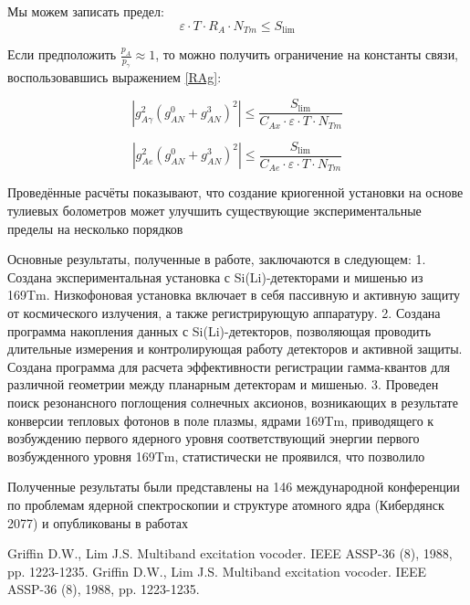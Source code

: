 \documentclass[a4paper,article,14pt]{extarticle}
\begin{document}
Мы можем записать предел:
\begin{equation}
   \varepsilon  \cdot T \cdot {R_A} \cdot N_{Tm} \leqslant {S_{\lim }}
\end{equation}

Если предположить $\frac{{{p_A}}}{{{p_\gamma}}} \approx 1$, то можно получить ограничение на константы связи, воспользовавшись выражением \eqref{RAg}:

\begin{equation}
     \left| g_{A\gamma}^2{\left( {g_{AN}^0 + g_{AN}^3} \right)^2} \right| \leqslant \frac{{S_{\lim }}}{{C_{Ax}} \cdot \varepsilon  \cdot T \cdot N_{Tm} } 
\end{equation}


\begin{equation}
     \left| g_{Ae}^2{\left( {g_{AN}^0 + g_{AN}^3} \right)^2} \right| \leqslant \frac{{S_{\lim }}}{{C_{Ae}} \cdot \varepsilon  \cdot T \cdot N_{Tm} } 
\end{equation}

\newpage

Проведённые расчёты показывают, что создание криогенной установки на основе тулиевых болометров может улучшить существующие экспериментальные пределы на несколько порядков
\pagebreak

Основные результаты, полученные в работе, заключаются в
следующем:
1. Создана экспериментальная установка с Si(Li)-детекторами и
мишенью из 169Tm. Низкофоновая установка включает в себя пассивную и
активную защиту от космического излучения, а также регистрирующую
аппаратуру.
2. Создана программа накопления данных с Si(Li)-детекторов,
позволяющая проводить длительные измерения и контролирующая работу
детекторов и активной защиты. Создана программа для расчета
эффективности регистрации гамма-квантов для различной геометрии между
планарным детекторам и мишенью.
3. Проведен поиск резонансного поглощения солнечных аксионов,
возникающих в результате конверсии тепловых фотонов в поле плазмы,
ядрами 169Tm, приводящего к возбуждению первого ядерного уровня  соответствующий энергии первого
возбужденного уровня 169Tm, статистически не проявился, что позволило

Полученные результаты были представлены на 146 международной
конференции по проблемам ядерной спектроскопии и структуре атомного
ядра (Кибердянск 2077) и опубликованы в работах



\begin{thebibliography}{1}
 Griffin D.W., Lim J.S. \flqq Multiband excitation vocoder\frqq. IEEE ASSP-36 (8), 1988, pp. 1223-1235.
 Griffin D.W., Lim J.S. \flqq Multiband excitation vocoder\frqq. IEEE ASSP-36 (8), 1988, pp. 1223-1235.
\end{thebibliography}
\end{document}
